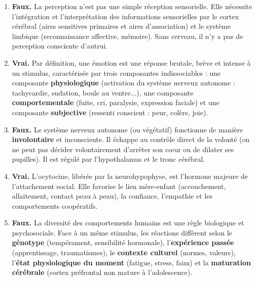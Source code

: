 \documentclass[11pt]{article}
\begin{document}
\begin{corrige}
\begin{enumerate}
\item \textbf{Faux.} La perception n'est pas une simple réception sensorielle. Elle nécessite l'intégration et l'interprétation des informations sensorielles par le cortex cérébral (aires sensitives primaires et aires d'association) et le système limbique (reconnaissance affective, mémoire). Sans cerveau, il n'y a pas de perception consciente d'autrui.
\item \textbf{Vrai.} Par définition, une émotion est une réponse brutale, brève et intense à un stimulus, caractérisée par trois composantes indissociables : une composante \textbf{physiologique} (activation du système nerveux autonome : tachycardie, sudation, boule au ventre...), une composante \textbf{comportementale} (fuite, cri, paralysie, expression faciale) et une composante \textbf{subjective} (ressenti conscient : peur, colère, joie).
\item \textbf{Faux.} Le système nerveux autonome (ou végétatif) fonctionne de manière \textbf{involontaire} et inconsciente. Il échappe au contrôle direct de la volonté (on ne peut pas décider volontairement d'arrêter son cœur ou de dilater ses pupilles). Il est régulé par l'hypothalamus et le tronc cérébral.
\item \textbf{Vrai.} L'ocytocine, libérée par la neurohypophyse, est l'hormone majeure de l'attachement social. Elle favorise le lien mère-enfant (accouchement, allaitement, contact peau à peau), la confiance, l'empathie et les comportements coopératifs.
\item \textbf{Faux.} La diversité des comportements humains est une règle biologique et psychosociale. Face à un même stimulus, les réactions diffèrent selon le \textbf{génotype} (tempérament, sensibilité hormonale), l'\textbf{expérience passée} (apprentissage, traumatismes), le \textbf{contexte culturel} (normes, valeurs), l'\textbf{état physiologique du moment} (fatigue, stress, faim) et la \textbf{maturation cérébrale} (cortex préfrontal non mature à l'adolescence).
\end{enumerate}
\end{corrige}
\end{document}
